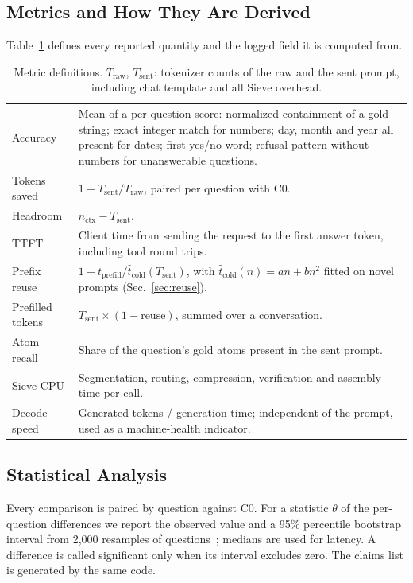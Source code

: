\documentclass[journal]{IEEEtran}
\begin{document}
\subsection{Metrics and How They Are Derived}
Table~\ref{tab:metrics} defines every reported quantity and the logged field it is computed from.
\begin{table}[t]\centering\caption{Metric definitions. $T_\text{raw}$, $T_\text{sent}$: tokenizer counts of the raw and the sent
prompt, including chat template and all Sieve overhead.}\label{tab:metrics}\scriptsize\setlength{\tabcolsep}{2.5pt}
\begin{tabular}{lp{}}\toprule
Accuracy & Mean of a per-question score: normalized containment of a gold string; exact integer match for numbers; day, month and year all present for dates; first yes/no word; refusal pattern without numbers for unanswerable questions.\\
Tokens saved & $1-T_\text{sent}/T_\text{raw}$, paired per question with C0.\\
Headroom & $n_\text{ctx}-T_\text{sent}$.\\
TTFT & Client time from sending the request to the first answer token, including tool round trips.\\
Prefix reuse & $1-t_\text{prefill}/\hat t_\text{cold}(T_\text{sent})$, with $\hat t_\text{cold}(n)=an+bn^2$ fitted on novel prompts (Sec.~\ref{sec:reuse}).\\
Prefilled tokens & $T_\text{sent}\times(1-\text{reuse})$, summed over a conversation.\\
Atom recall & Share of the question's gold atoms present in the sent prompt.\\
Sieve CPU & Segmentation, routing, compression, verification and assembly time per call.\\
Decode speed & Generated tokens / generation time; independent of the prompt, used as a machine-health indicator.\\
\bottomrule\end{tabular}\end{table}

\subsection{Statistical Analysis}
Every comparison is paired by question against C0. For a statistic $\theta$ of the per-question differences we report the observed
value and a 95\% percentile bootstrap interval from 2,000 resamples of questions~\cite{efron1979bootstrap}; medians are used for
latency. A difference is called significant only when its interval excludes zero. The claims list is generated by the same code.
\end{document}
